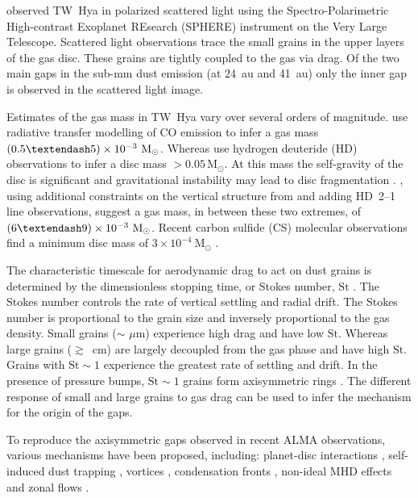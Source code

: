 \documentclass[usenatbib,a4paper,times]{mnras}
\newcommand{\st}{\mathrm{St}}
\renewcommand{\sun}{\mathrm{M}_{\odot}}
\begin{document}
\citet{van-boekel:2017} observed TW~Hya in polarized scattered light using the
Spectro-Polarimetric High-contrast Exoplanet REsearch (SPHERE) instrument on the
Very Large Telescope. Scattered light observations trace the small grains in the
upper layers of the gas disc. These grains are tightly coupled to the gas via
drag. Of the two main gaps in the sub-mm dust emission (at 24~au and 41~au) only
the inner gap is observed in the scattered light image.

Estimates of the gas mass in TW~Hya vary over several orders of magnitude.
\citet{thi:2010} use radiative transfer modelling of CO emission to infer a gas
mass $(0.5\textendash 5)\times10^{-3}~\sun{}$. Whereas \citet{bergin:2013} use
hydrogen deuteride (HD) observations to infer a disc mass $>0.05\,\sun{}$. At
this mass the self-gravity of the disc is significant and gravitational
instability may lead to disc fragmentation \citep{kratter:2016}.
\citet{trapman:2017}, using additional constraints on the vertical structure
from \citet{kama:2016} and adding HD~2--1 line observations, suggest a gas mass,
in between these two extremes, of $(6\textendash 9)\times10^{-3}~\sun{}$. Recent
carbon sulfide (CS) molecular observations find a minimum disc mass of
$3\times10^{-4}~\sun{}$ \citep{teague:2018a}.

The characteristic timescale for aerodynamic drag to act on dust grains is
determined by the dimensionless stopping time, or Stokes number, $\st{}$
\citep{weidenschilling:1977, takeuchi:2002}. The Stokes number controls the rate
of vertical settling and radial drift. The Stokes number is proportional to the
grain size and inversely proportional to the gas density. Small grains ($\sim$
$\mu$m) experience high drag and have low $\st{}$. Whereas large grains
($\gtrsim$~cm) are largely decoupled from the gas phase and have high $\st{}$.
Grains with $\st{}\sim1$ experience the greatest rate of settling and drift.
In the presence of pressure bumps, $\st{}\sim1$ grains form axisymmetric
rings \citep{ayliffe:2012, dipierro:2015}.  The different response of small and
large grains to gas drag can be used to infer the mechanism for the origin of
the gaps.

To reproduce the axisymmetric gaps observed in recent ALMA observations, various
mechanisms have been proposed, including: planet-disc interactions
\citep{dipierro:2015}, self-induced dust trapping \citep{gonzalez:2017},
vortices \citep{zhu:2014}, condensation fronts \citep{zhang:2015}, non-ideal MHD
effects \citep{bethune:2016} and zonal flows \citep{johansen:2009,flock:2015}.
\end{document}

